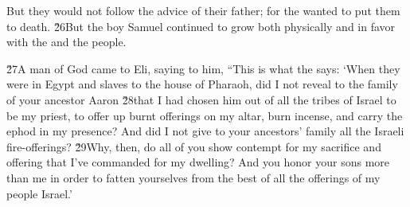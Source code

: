 But they would not follow the advice of their father; for the  wanted to put them to death. \v{26}But the boy Samuel continued to grow both physically and in favor with the  and the people.

\v{27}A man of God came to Eli, saying to him, ``This is what the  says: `When they were in Egypt and slaves to the house of Pharaoh, did I not reveal to the family of your ancestor Aaron \v{28}that I had chosen him out of all the tribes of Israel to be my priest, to offer up burnt offerings on my altar, burn incense, and carry the ephod in my presence? And did I not give to your ancestors' family all the Israeli fire-offerings? \v{29}Why, then, do all of you show contempt for my sacrifice and offering that I've commanded for my dwelling? And you honor your sons more than me in order to fatten yourselves from the best of all the offerings of my people Israel.'

